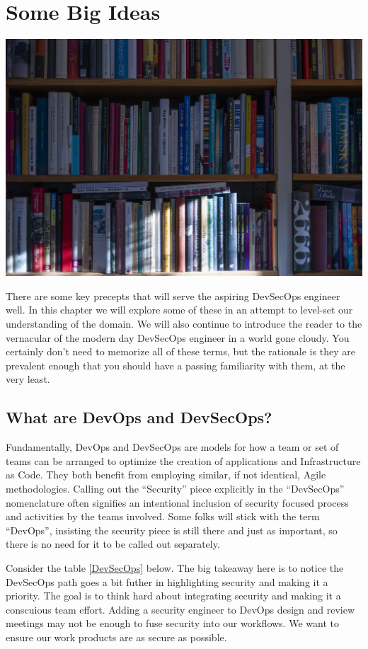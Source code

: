 \chapter{Some Big Ideas}

\centering
\includegraphics{images/book-5104342_1920.jpg}

\justify{}
There are some key precepts that will serve the aspiring DevSecOps engineer well. In this
chapter we will explore some of these in an attempt to level-set our understanding of the
domain. We will also continue to introduce the reader to the vernacular of the modern day
DevSecOps engineer in a world gone cloudy. You certainly don't need to memorize all of these terms, but the rationale
is they are prevalent enough that you should have a passing familiarity with them, at the very least.

\section{What are DevOps and DevSecOps?}

\justify{}
Fundamentally, DevOps and DevSecOps are models for how a team or set of teams can be arranged
to optimize the creation of applications and Infrastructure as Code. They both benefit from
employing similar, if not identical, Agile methodologies. Calling out the ``Security''
piece explicitly in the ``DevSecOps'' nomenclature often signifies an intentional inclusion
of security focused process and activities by the teams involved. Some folks will stick with
the term ``DevOps'', insisting the security piece is still there and just as important, so
there is no need for it to be called out separately.

\justify{}
Consider the table \ref{DevSecOps} below. The big takeaway here is to notice the
DevSecOps path goes a bit futher
in highlighting security and making it a priority. The goal is to think hard about integrating
security and making it a conscuious team effort. Adding a security engineer to DevOps design
and review meetings may not be enough to fuse security into our workflows. We want to ensure
our work products are as secure as possible.

